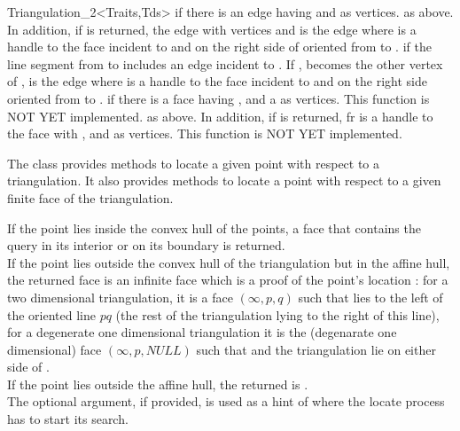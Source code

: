 \begin{ccRefClass}{Triangulation_2<Traits,Tds>}
{ if there is an edge having  and  as
vertices.}
\ccGlue
{}
{ as above. In addition, if  is returned,  the edge with
vertices  and  is the edge  where
 is a handle to the face incident to  and 
on the right side of   oriented from  to .}
\ccGlue
{}
{ if the line segment from  to  includes
an edge  incident to . If ,  becomes
the other vertex of ,  is the edge  where
 is a handle to the face incident to  and 
on the right side  oriented from  to .}
\ccGlue
{}
{ if there is a face having ,  and a 
as vertices. This function is NOT YET implemented.}
\ccGlue
{}
{as above. In addition, if  is returned, fr is a handle
to the face with  ,  and  
as vertices. This function is NOT YET implemented.} 


The class \ccRefName  provides methods to locate
a given point with respect to a triangulation. It also provides
methods to locate a point with respect to
a given  finite face of the triangulation.


{If the point  lies inside the convex hull of the points, a face 
that contains the query in its interior or on its
 boundary is returned.\\
If the point  lies outside the convex hull of the
triangulation but in the affine hull,
the returned face is an infinite face which is a proof of the point's
location :
for a two dimensional triangulation, it is a face $(\infty, p, q)$ 
such that
 lies to the left  of the oriented line $pq$ 
(the rest of the triangulation lying to the right of this line),
for a degenerate one dimensional triangulation it is the (degenarate
one dimensional) face $(\infty, p, NULL)$ such that 
and the triangulation lie on either side of . \\
If the point  lies outside the affine hull,
the returned  is . \\
The optional  argument, if provided, is used as a hint
of where the locate process has to start its search.}


\end{ccRefClass}
